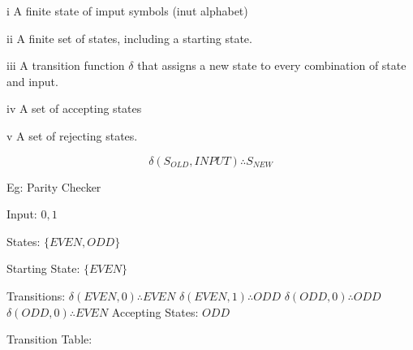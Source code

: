 \documentclass[a4paper,12pt]{article}
\begin{document}
i A finite state of imput symbols (inut alphabet)

ii A finite set of states, including a starting state.

iii A transition function  $\delta$ that assigns a new state to every
combination of state and input.

iv A set of accepting states

v A set of rejecting states.

\[ \delta(S_{OLD}, INPUT) \therefore S_{NEW} \]


Eg: Parity Checker

Input: $0, 1$

States: $\{EVEN, ODD \}$

Starting State: $\{EVEN\}$

Transitions:	$\delta(EVEN, 0) \therefore EVEN $
					$\delta(EVEN, 1) \therefore ODD $
					$\delta(ODD, 0) \therefore ODD $
					$\delta(ODD, 0) \therefore EVEN $
Accepting States: ${ODD}$


Transition Table:
\end{document}
